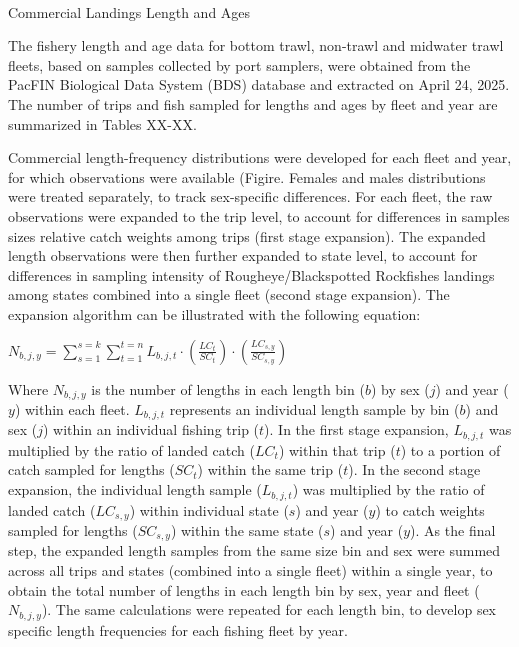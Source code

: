 \documentclass[
]{scrartcl}
\makeatletter
\let\oldparagraph\paragraph
\renewcommand{\paragraph}{
    \@ifstar
      \xxxParagraphStar
      \xxxParagraphNoStar
  }
\newcommand{\xxxParagraphStar}[1]{\oldparagraph*{#1}\mbox{}}
\newcommand{\xxxParagraphNoStar}[1]{\oldparagraph{#1}\mbox{}}
\makeatother
\begin{document}
\paragraph{Commercial Landings Length and
Ages}\label{commercial-landings-length-and-ages}

The fishery length and age data for bottom trawl, non-trawl and midwater
trawl fleets, based on samples collected by port samplers, were obtained
from the PacFIN Biological Data System (BDS) database and extracted on
April 24, 2025. The number of trips and fish sampled for lengths and
ages by fleet and year are summarized in Tables XX-XX.

Commercial length-frequency distributions were developed for each fleet
and year, for which observations were available (Figire. Females and
males distributions were treated separately, to track sex-specific
differences. For each fleet, the raw observations were expanded to the
trip level, to account for differences in samples sizes relative catch
weights among trips (first stage expansion). The expanded length
observations were then further expanded to state level, to account for
differences in sampling intensity of Rougheye/Blackspotted Rockfishes
landings among states combined into a single fleet (second stage
expansion). The expansion algorithm can be illustrated with the
following equation:

\begin{centering}

$N_{b,j,y} = \displaystyle\sum_{s=1}^{s=k}\displaystyle\sum_{t=1}^{t=n}L_{b,j,t} \cdot
\left(\frac{LC_t}{SC_t}\right) \cdot \left(\frac{LC_{s,y}}{SC_{s,y}}\right)$

\end{centering}

Where \(N_{b,j,y}\) is the number of lengths in each length bin (\(b\))
by sex (\(j\)) and year (\(y\)) within each fleet. \(L_{b,j,t}\)
represents an individual length sample by bin (\(b\)) and sex (\(j\))
within an individual fishing trip (\(t\)). In the first stage expansion,
\(L_{b,j,t}\) was multiplied by the ratio of landed catch (\(LC_t\))
within that trip (\(t\)) to a portion of catch sampled for lengths
(\(SC_t\)) within the same trip (\(t\)). In the second stage expansion,
the individual length sample (\(L_{b,j,t}\)) was multiplied by the ratio
of landed catch (\(LC_{s,y}\)) within individual state (\(s\)) and year
(\(y\)) to catch weights sampled for lengths (\(SC_{s,y}\)) within the
same state (\(s\)) and year (\(y\)). As the final step, the expanded
length samples from the same size bin and sex were summed across all
trips and states (combined into a single fleet) within a single year, to
obtain the total number of lengths in each length bin by sex, year and
fleet (\(N_{b,j,y}\)). The same calculations were repeated for each
length bin, to develop sex specific length frequencies for each fishing
fleet by year.
\end{document}
